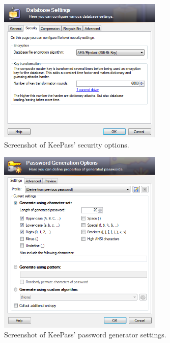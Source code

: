 			\begin{figure}[h!]
				\centering
				\includegraphics[width=0.7\textwidth]{figures/analysis/keepass_create_security.png}
				\caption{Screenshot of KeePass' security options.}
				\label{fig:keepass_create_security}
			\end{figure}
		

			\begin{figure}[h!]
				\centering
				\includegraphics[width=0.7\textwidth]{figures/analysis/keepass_newpassword_passwordgen.png}
				\caption{Screenshot of KeePass' password generator settings.}
				\label{fig:keepass_newpassword_passwordgen}
			\end{figure}

